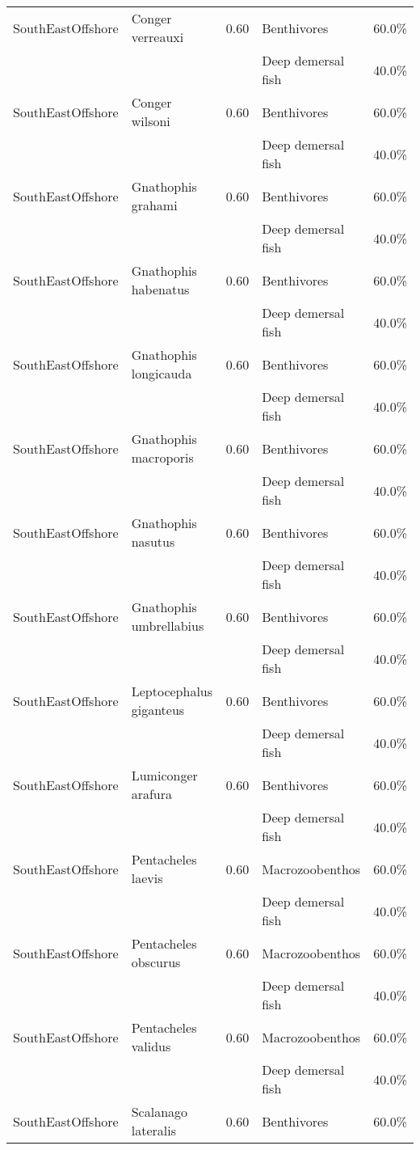 \begin{longtable}{llcll}
\hline
SouthEastOffshore & Conger verreauxi & 0.60 & Benthivores & 60.0\% \\
& & & Deep demersal fish & 40.0\% \\
\hline
SouthEastOffshore & Conger wilsoni & 0.60 & Benthivores & 60.0\% \\
& & & Deep demersal fish & 40.0\% \\
\hline
SouthEastOffshore & Gnathophis grahami & 0.60 & Benthivores & 60.0\% \\
& & & Deep demersal fish & 40.0\% \\
\hline
SouthEastOffshore & Gnathophis habenatus & 0.60 & Benthivores & 60.0\% \\
& & & Deep demersal fish & 40.0\% \\
\hline
SouthEastOffshore & Gnathophis longicauda & 0.60 & Benthivores & 60.0\% \\
& & & Deep demersal fish & 40.0\% \\
\hline
SouthEastOffshore & Gnathophis macroporis & 0.60 & Benthivores & 60.0\% \\
& & & Deep demersal fish & 40.0\% \\
\hline
SouthEastOffshore & Gnathophis nasutus & 0.60 & Benthivores & 60.0\% \\
& & & Deep demersal fish & 40.0\% \\
\hline
SouthEastOffshore & Gnathophis umbrellabius & 0.60 & Benthivores & 60.0\% \\
& & & Deep demersal fish & 40.0\% \\
\hline
SouthEastOffshore & Leptocephalus giganteus & 0.60 & Benthivores & 60.0\% \\
& & & Deep demersal fish & 40.0\% \\
\hline
SouthEastOffshore & Lumiconger arafura & 0.60 & Benthivores & 60.0\% \\
& & & Deep demersal fish & 40.0\% \\
\hline
SouthEastOffshore & Pentacheles laevis & 0.60 & Macrozoobenthos & 60.0\% \\
& & & Deep demersal fish & 40.0\% \\
\hline
SouthEastOffshore & Pentacheles obscurus & 0.60 & Macrozoobenthos & 60.0\% \\
& & & Deep demersal fish & 40.0\% \\
\hline
SouthEastOffshore & Pentacheles validus & 0.60 & Macrozoobenthos & 60.0\% \\
& & & Deep demersal fish & 40.0\% \\
\hline
SouthEastOffshore & Scalanago lateralis & 0.60 & Benthivores & 60.0\% \\

\end{longtable}
